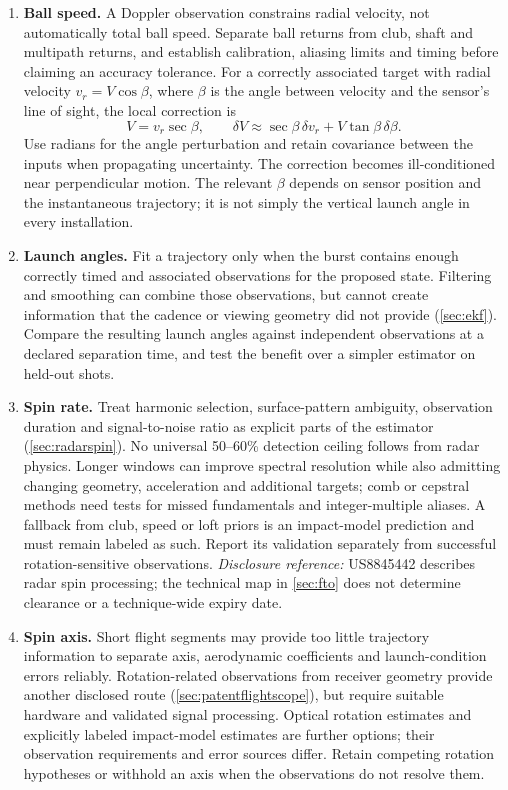 \begin{enumerate}
\item \textbf{Ball speed.}
A Doppler observation constrains radial velocity, not automatically total ball speed.
Separate ball returns from club, shaft and multipath returns, and establish calibration, aliasing limits and timing before claiming an accuracy tolerance.
For a correctly associated target with radial velocity $v_r=V\cos\beta$, where $\beta$ is the angle between velocity and the sensor's line of sight, the local correction is
\begin{equation}
\label{eq:designspeeduncertainty}
V=v_r\sec\beta,\qquad
\delta V\approx\sec\beta\,\delta v_r+V\tan\beta\,\delta\beta.
\end{equation}
Use radians for the angle perturbation and retain covariance between the inputs when propagating uncertainty.
The correction becomes ill-conditioned near perpendicular motion.
The relevant $\beta$ depends on sensor position and the instantaneous trajectory; it is not simply the vertical launch angle in every installation.
\item \textbf{Launch angles.}
Fit a trajectory only when the burst contains enough correctly timed and associated observations for the proposed state.
Filtering and smoothing can combine those observations, but cannot create information that the cadence or viewing geometry did not provide (\cref{sec:ekf}).
Compare the resulting launch angles against independent observations at a declared separation time, and test the benefit over a simpler estimator on held-out shots.
\item \textbf{Spin rate.}
Treat harmonic selection, surface-pattern ambiguity, observation duration and signal-to-noise ratio as explicit parts of the estimator (\cref{sec:radarspin}).
No universal 50--60\% detection ceiling follows from radar physics.
Longer windows can improve spectral resolution while also admitting changing geometry, acceleration and additional targets; comb or cepstral methods need tests for missed fundamentals and integer-multiple aliases.
A fallback from club, speed or loft priors is an impact-model prediction and must remain labeled as such.
Report its validation separately from successful rotation-sensitive observations.
\emph{Disclosure reference:} US8845442 describes radar spin processing; the technical map in \cref{sec:fto} does not determine clearance or a technique-wide expiry date.
\item \textbf{Spin axis.}
Short flight segments may provide too little trajectory information to separate axis, aerodynamic coefficients and launch-condition errors reliably.
Rotation-related observations from receiver geometry provide another disclosed route (\cref{sec:patentflightscope}), but require suitable hardware and validated signal processing.
Optical rotation estimates and explicitly labeled impact-model estimates are further options; their observation requirements and error sources differ.
Retain competing rotation hypotheses or withhold an axis when the observations do not resolve them.
\end{enumerate}

